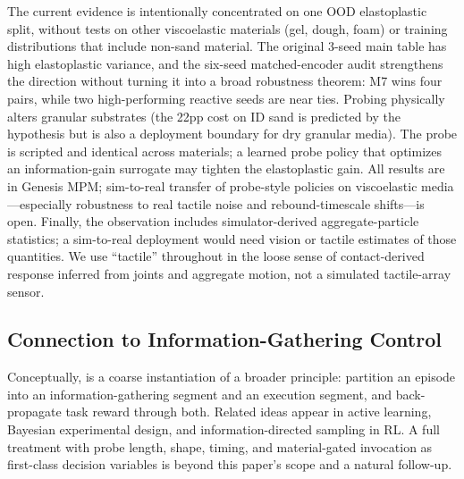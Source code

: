 The current evidence is intentionally concentrated on one OOD elastoplastic split, without tests on other viscoelastic materials (gel, dough, foam) or training distributions that include non-sand material. The original 3-seed main table has high elastoplastic variance, and the six-seed matched-encoder audit strengthens the direction without turning it into a broad robustness theorem: M7 wins four pairs, while two high-performing reactive seeds are near ties. Probing physically alters granular substrates (the 22pp cost on ID sand is predicted by the hypothesis but is also a deployment boundary for dry granular media). The probe is scripted and identical across materials; a learned probe policy that optimizes an information-gain surrogate may tighten the elastoplastic gain. All results are in Genesis MPM; sim-to-real transfer of probe-style policies on viscoelastic media---especially robustness to real tactile noise and rebound-timescale shifts---is open. Finally, the observation includes simulator-derived aggregate-particle statistics; a sim-to-real deployment would need vision or tactile estimates of those quantities. We use ``tactile'' throughout in the loose sense of contact-derived response inferred from joints and aggregate motion, not a simulated tactile-array sensor.

\subsection{Connection to Information-Gathering Control}

Conceptually, \PTA{} is a coarse instantiation of a broader principle: partition an episode into an information-gathering segment and an execution segment, and back-propagate task reward through both. Related ideas appear in active learning, Bayesian experimental design, and information-directed sampling in RL. A full treatment with probe length, shape, timing, and material-gated invocation as first-class decision variables is beyond this paper's scope and a natural follow-up.
